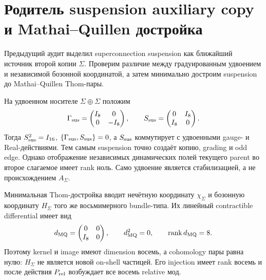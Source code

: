 \chapter{Родитель suspension auxiliary copy и Mathai--Quillen достройка}
\label{ch:v10-h15-r2-superconnection-suspension-auxiliary-copy-parent}

Предыдущий аудит выделил superconnection suspension как ближайший источник
второй копии $\Sigma$. Проверим различие между градуированным удвоением и
независимой бозонной координатой, а затем минимально достроим suspension до
Mathai--Quillen Thom-пары.

На удвоенном носителе $\Sigma\oplus\Sigma$ положим
\begin{equation}
 \Gamma_{\rm sus}=\begin{pmatrix}I_8&0\\0&-I_8\end{pmatrix},
 \qquad
 S_{\rm sus}=\begin{pmatrix}0&I_8\\I_8&0\end{pmatrix}.
\end{equation}
Тогда $S_{\rm sus}^2=I_{16}$, $\{\Gamma_{\rm sus},S_{\rm sus}\}=0$, а
$S_{\rm sus}$ коммутирует с удвоенными gauge- и Real-действиями. Тем самым
suspension точно создаёт копию, grading и odd edge. Однако отображение
независимых динамических полей текущего parent во второе слагаемое имеет
rank ноль. Само удвоение является стабилизацией, а не происхождением
$A_\Sigma$.

Минимальная Thom-достройка вводит нечётную координату $\chi_\Sigma$ и
бозонную координату $H_\Sigma$ того же восьмимерного bundle-типа. Их
линейный contractible differential имеет вид
\begin{equation}
 d_{\rm MQ}=\begin{pmatrix}0&0\\I_8&0\end{pmatrix},
 \qquad d_{\rm MQ}^2=0,
 \qquad \operatorname{rank} d_{\rm MQ}=8.
\end{equation}
Поэтому kernel и image имеют dimension восемь, а cohomology пары равна
нулю: $H_\Sigma$ не является новой on-shell частицей. Его injection имеет
rank восемь и после действия $P_{\rm rel}$ возбуждает все восемь relative
мод.

